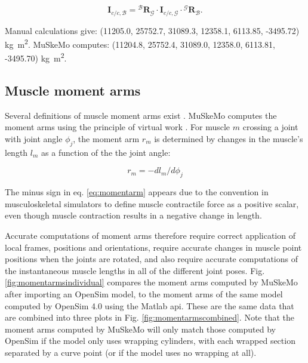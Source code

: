 \documentclass{article}
\begin{document}
\begin{equation}
    \mathbf{I}_{c/c,{\mathcal{B}}} = {}^{\mathcal{B}} \mathbf{R}_{\mathcal{G}} \cdot \mathbf{I}_{c/c,{\mathcal{G}}} \cdot {}^{\mathcal{G}} \mathbf{R}_{\mathcal{B}}.
\end{equation}

Manual calculations give: (11205.0, 25752.7, 31089.3, 12358.1, 6113.85, -3495.72) \si{kg m^2}. MuSkeMo computes: (11204.8, 25752.4, 31089.0, 12358.0, 6113.81, -3495.70) \si{kg m^2}.


\subsection{Muscle moment arms}
\label{sec:momentarmvalidation}

Several definitions of muscle moment arms exist \cite{anDeterminationMuscleOrientations1984}. MuSkeMo computes the moment arms using the principle of virtual work \cite{anDeterminationMuscleOrientations1984,storaceFunctionalAnalysisRole1979}. For muscle \(m\) crossing a joint with joint angle \(\phi_j\), the moment arm \(r_m\) is determined by changes in the muscle's length \(l_m\) as a function of the the joint angle:

\begin{equation}
r_m = -dl_m / d\phi_j
\end{equation}
\label{eq:momentarm}

The minus sign in eq. \ref{eq:momentarm} appears due to the convention in musculoskeletal simulators to define muscle contractile force as a positive scalar, even though muscle contraction results in a negative change in length.

Accurate computations of moment arms therefore require correct application of local frames, positions and orientations, require accurate changes in muscle point positions when the joints are rotated, and also require accurate computations of the instantaneous muscle lengths in all of the different joint poses. Fig. \ref{fig:momentarmsindividual} compares the moment arms computed by MuSkeMo after importing an OpenSim model, to the moment arms of the same model computed by OpenSim 4.0 using the Matlab api. These are the same data that are combined into three plots in Fig. \ref{fig:momentarmscombined}. Note that the moment arms computed by MuSkeMo will only match those computed by OpenSim if the model only uses wrapping cylinders, with each wrapped section separated by a curve point (or if the model uses no wrapping at all).
\end{document}
